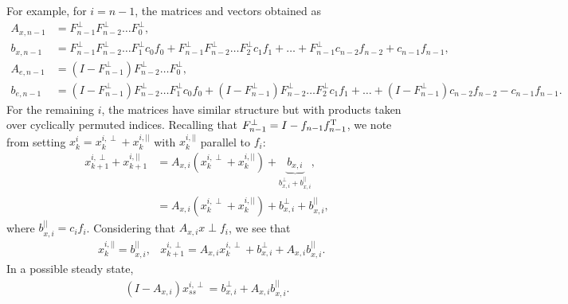 \documentclass[hidelinks]{article}
\begin{document}
\newpage
For example, for $i=n-1$, the matrices and vectors obtained as
\begin{align*}
A_{x,n-1}&=F^\perp_{n-1} F^\perp_{n-2}\dots F^\perp_0,\\
b_{x,n-1}&=F^\perp_{n-1} F^\perp_{n-2}\dots F^\perp_1 c_0 f_0 + F^\perp_{n-1} F^\perp_{n-2}\dots F^\perp_2 c_1 f_1+\dots+F^\perp_{n-1}c_{n-2}f_{n-2}+c_{n-1} f_{n-1},\\
A_{e,n-1}&=(I-F^\perp_{n-1}) F^\perp_{n-2}\dots F^\perp_0,\\
b_{e,n-1}&=(I-F^\perp_{n-1}) F^\perp_{n-2}\dots F^\perp_1 c_0 f_0 + (I-F^\perp_{n-1}) F^\perp_{n-2}\dots F^\perp_2 c_1 f_1+\dots+(I-F^\perp_{n-1})c_{n-2}f_{n-2}-c_{n-1} f_{n-1}.
\end{align*}
For the remaining $i$, the matrices have similar structure but with products taken over cyclically permuted indices. Recalling that $F^\perp_{n-1}=I-f_{n-1}f_{n-1}^{\text{T}}$, we note from setting $x_{k}^i=x_{k}^{i,\perp}+x_{k}^{i,||}$ with $x_{k}^{i,||}$ parallel to $f_{i}$:
\begin{align*}
x_{k+1}^{i,\perp}+x_{k+1}^{i,||} &= A_{x,i} (x_{k}^{i,\perp}+x_{k}^{i,||})+\underbrace{b_{x,i}}_{b_{x,i}^\perp + b_{x,i}^{||}},\\
&=A_{x,i} (x_{k}^{i,\perp}+x_{k}^{i,||})+b_{x,i}^\perp + b_{x,i}^{||},
\end{align*}
where $b_{x,i}^{||}=c_i f_i$. Considering that $A_{x,i} x \perp f_i$, we see that
\begin{align*}
&x_{k}^{i,||}=b_{x,i}^{||},
&x_{k+1}^{i,\perp}=A_{x,i}x_{k}^{i,\perp} + b_{x,i}^\perp+A_{x,i}b_{x,i}^{||}.
\end{align*}
In a possible steady state, 
\begin{align*}
(I-A_{x,i})x_{ss}^{i,\perp}=b_{x,i}^\perp+A_{x,i}b_{x,i}^{||}.
\end{align*}
\end{document}
